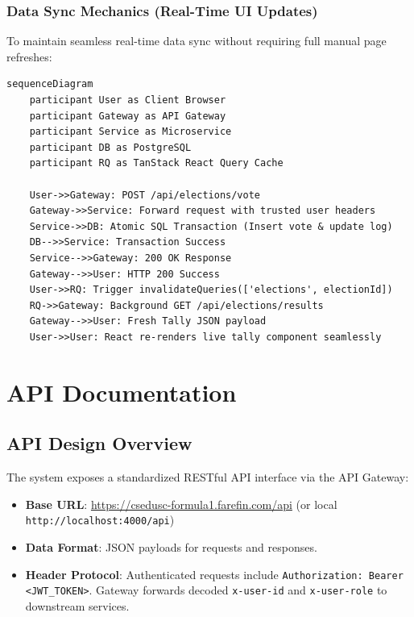 \documentclass[12pt, a4paper]{article}
\begin{document}
\subsubsection{Data Sync Mechanics (Real-Time UI Updates)}
To maintain seamless real-time data sync without requiring full manual page refreshes:
\begin{lstlisting}[language=mermaid, caption={Data Sync Flow Sequence Diagram}]
sequenceDiagram
    participant User as Client Browser
    participant Gateway as API Gateway
    participant Service as Microservice
    participant DB as PostgreSQL
    participant RQ as TanStack React Query Cache

    User->>Gateway: POST /api/elections/vote
    Gateway->>Service: Forward request with trusted user headers
    Service->>DB: Atomic SQL Transaction (Insert vote & update log)
    DB-->>Service: Transaction Success
    Service-->>Gateway: 200 OK Response
    Gateway-->>User: HTTP 200 Success
    User->>RQ: Trigger invalidateQueries(['elections', electionId])
    RQ->>Gateway: Background GET /api/elections/results
    Gateway-->>User: Fresh Tally JSON payload
    User->>User: React re-renders live tally component seamlessly
\end{lstlisting}

\section{API Documentation}

\subsection{API Design Overview}
The system exposes a standardized RESTful API interface via the API Gateway:
\begin{itemize}
    \item \textbf{Base URL}: \url{https://csedusc-formula1.farefin.com/api} (or local \texttt{http://localhost:4000/api})
    \item \textbf{Data Format}: JSON payloads for requests and responses.
    \item \textbf{Header Protocol}: Authenticated requests include \texttt{Authorization: Bearer <JWT\_TOKEN>}. Gateway forwards decoded \texttt{x-user-id} and \texttt{x-user-role} to downstream services.
\end{itemize}
\end{document}
